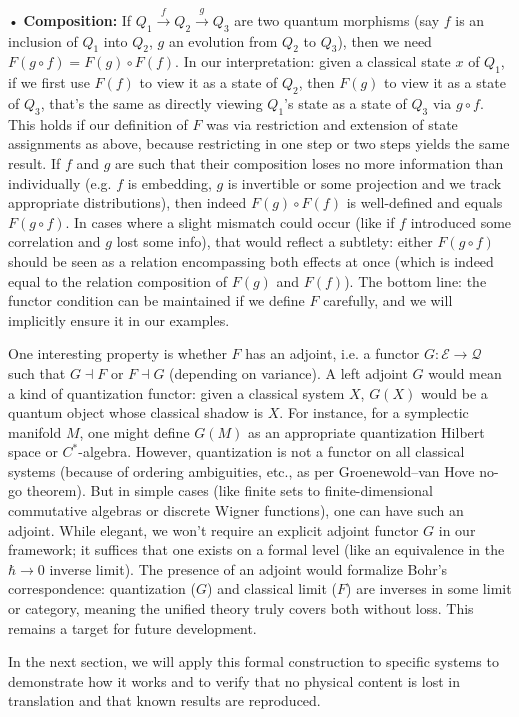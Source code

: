 	•	\textbf{Composition:} If $Q_1 \xrightarrow{f} Q_2 \xrightarrow{g} Q_3$ are two quantum morphisms (say $f$ is an inclusion of $Q_1$ into $Q_2$, $g$ an evolution from $Q_2$ to $Q_3$), then we need $F(g\circ f) = F(g)\circ F(f)$. In our interpretation: given a classical state $x$ of $Q_1$, if we first use $F(f)$ to view it as a state of $Q_2$, then $F(g)$ to view it as a state of $Q_3$, that’s the same as directly viewing $Q_1$’s state as a state of $Q_3$ via $g\circ f$. This holds if our definition of $F$ was via restriction and extension of state assignments as above, because restricting in one step or two steps yields the same result. If $f$ and $g$ are such that their composition loses no more information than individually (e.g. $f$ is embedding, $g$ is invertible or some projection and we track appropriate distributions), then indeed $F(g)\circ F(f)$ is well-defined and equals $F(g\circ f)$. In cases where a slight mismatch could occur (like if $f$ introduced some correlation and $g$ lost some info), that would reflect a subtlety: either $F(g\circ f)$ should be seen as a relation encompassing both effects at once (which is indeed equal to the relation composition of $F(g)$ and $F(f)$). The bottom line: the functor condition can be maintained if we define $F$ carefully, and we will implicitly ensure it in our examples.

One interesting property is whether $F$ has an adjoint, i.e. a functor $G: \mathcal{E} \to \mathcal{Q}$ such that $G \dashv F$ or $F \dashv G$ (depending on variance). A left adjoint $G$ would mean a kind of quantization functor: given a classical system $X$, $G(X)$ would be a quantum object whose classical shadow is $X$. For instance, for a symplectic manifold $M$, one might define $G(M)$ as an appropriate quantization Hilbert space or $C^*$-algebra. However, quantization is not a functor on all classical systems (because of ordering ambiguities, etc., as per Groenewold–van Hove no-go theorem). But in simple cases (like finite sets to finite-dimensional commutative algebras or discrete Wigner functions), one can have such an adjoint. While elegant, we won’t require an explicit adjoint functor $G$ in our framework; it suffices that one exists on a formal level (like an equivalence in the $\hbar\to0$ inverse limit). The presence of an adjoint would formalize Bohr’s correspondence: quantization ($G$) and classical limit ($F$) are inverses in some limit or category, meaning the unified theory truly covers both without loss. This remains a target for future development.

In the next section, we will apply this formal construction to specific systems to demonstrate how it works and to verify that no physical content is lost in translation and that known results are reproduced.